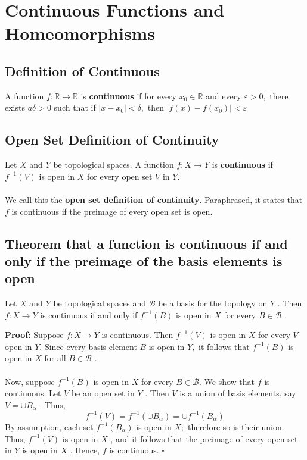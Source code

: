 \documentclass[12pt]{article}
\newenvironment{proofed}[1][]{\par \medskip \noindent \textbf{#1 Proof: }}{\hfill$\square$}
\begin{document}
\pagestyle{fancy}  
\lfoot{} \cfoot{} \rfoot{}

\setcounter{section}{3}

\section{Continuous Functions and Homeomorphisms}
	\subsection{Definition of Continuous}
		A function $f : \mathbb { R } \rightarrow \mathbb { R }$ is \textbf{continuous} if for every $x _ { 0 } \in \mathbb { R }$ and every $\varepsilon > 0 ,$ there exists $a \delta > 0$ such that if $\left| x - x _ { 0 } \right| < \delta ,$ then $\left| f ( x ) - f \left( x _ { 0 } \right) \right| < \varepsilon$
		
	\subsection{Open Set Definition of Continuity}
		Let $X$ and $Y$ be topological spaces. A function $f : X \rightarrow Y$ is \textbf{continuous} if $f ^ { - 1 } ( V )$ is open in $X$ for every open set $V$ in $Y .$\\
		\\
		We call this the \textbf{open set definition of continuity}. Paraphrased, it states
		that $f$ is continuous if the preimage of every open set is open.
	
	\subsection{Theorem that a function is continuous if and only if the preimage of the basis elements is open}
		Let $X$ and $Y$ be topological spaces and $\mathcal { B }$ be a basis for the
		topology on $Y$ . Then $f : X \rightarrow Y$ is continuous if and only if $f ^ { - 1 } ( B )$ is open
		in $X$ for every $B \in \mathcal { B }$ .
	\begin{proofed}
			Suppose $f : X \rightarrow Y$ is continuous. Then $f ^ { - 1 } ( V )$ is open in
		$X$ for every $V$ open in $Y .$ Since every basis element $B$ is open in $Y ,$ it
		follows that $f ^ { - 1 } ( B )$ is open in $X$ for all $B \in \mathcal { B }$ .\\
		\\
		Now, suppose $f ^ { - 1 } ( B )$ is open in $X$ for every $B \in \mathcal { B } .$ We show that
		$f$ is continuous. Let $V$ be an open set in $Y$ . Then $V$ is a union of basis
		elements, say $V = \cup B _ { \alpha }$ . Thus,
			\[f ^ { - 1 } ( V ) = f ^ { - 1 } \left( \cup B _ { \alpha } \right) = \cup f ^ { - 1 } \left( B _ { \alpha } \right)\]
		By assumption, each set $f ^ { - 1 } \left( B _ { \alpha } \right)$ is open in $X ;$ therefore so is their
		union. Thus, $f ^ { - 1 } ( V )$ is open in $X$ , and it follows that the preimage of
		every open set in $Y$ is open in $X$ . Hence, $f$ is continuous.
	\end{proofed}
\end{document}
